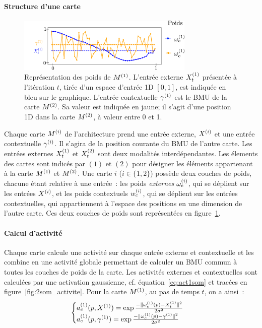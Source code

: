 \documentclass[../main]{subfiles}
\begin{document}
\paragraph{Structure d'une carte}
\begin{figure}
    \centering
    \includegraphics[width=0.75\textwidth]{weights_2som.pdf}
    \caption{Représentation des poids de $M^{({1})}$. L'entrée externe $X_t^{({1})}$ présentée à l'itération $t$, tirée d'un espace d'entrée 1D $[0,1]$, est indiquée en bleu sur le graphique. L'entrée contextuelle $\gamma^{({1})}$ est le BMU de la carte $M^{({2})}$. Sa valeur est indiquée en jaune; il s'agit d'une position 1D dans la carte $M^{({2})}$, à valeur entre 0 et 1. \label{fig:2som_weights}}
    \end{figure}
Chaque carte $M^{({i})}$ de l'architecture prend une entrée externe, $X^{({i})}$ et une entrée contextuelle $\gamma^{({i})}$. Il s'agira de la position courante du BMU de l'autre carte.
Les entrées externes $X^{({1})}_t$ et $X^{({2})}_t$ sont deux modalités interdépendantes.
Les élements des cartes sont indicés par $(1)$ et $(2)$ pour désigner les éléments appartenant à la carte $M^{({1})}$ et $M^{({2})}$.
Une carte $i$ ($i \in \{1,2\}$) possède deux couches de poids, chacune étant relative à une entrée~: les poids \emph{externes} $\omega_e^{({i})}$, qui se déplient sur les entrées $X^{({i})}$, et les poids contextuels $w_c^{({i})}$, qui se déplient sur les entrées contextuelles, qui appartiennent à l'espace des positions en une dimension de l'autre carte. 
Ces deux couches de poids sont représentées en figure~\ref{fig:2som_weights}. 

\paragraph{Calcul d'activité}

Chaque carte calcule une activité sur chaque entrée externe et contextuelle et les combine en une activité globale permettant de calculer un BMU commun à toutes les couches de poids de la carte.
Les activités externes et contextuelles sont calculées par une activation gaussienne, cf. équation~\ref{eq:act1som} et tracées en figure~\ref{fig:2som_activite}.
Pour la carte $M^{({1})}$, au pas de temps $t$, on a ainsi~:
\begin{equation}
\label{eq:activite}
\begin{cases}
a_e^{({1})}(p, X^{({1})}) = \exp\frac{-\lVert \omega_e^{({1})}(p)-X^{({1})}_t \rVert^2}{2\sigma^2} \\
a_c^{({1})}(p, \gamma^{({1})}) = \exp\frac{-\lVert \omega_c^{({1})}(p)-\gamma^{({1})} \rVert ^2}{2\sigma^2}\\
\end{cases}
\end{equation}
\end{document}

